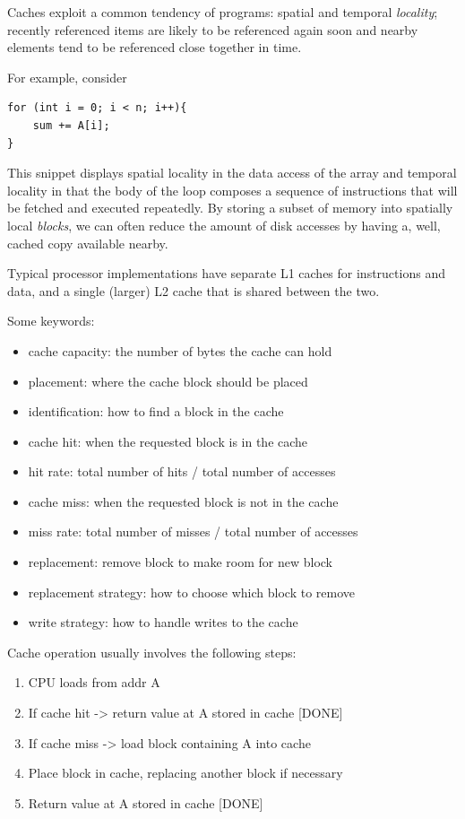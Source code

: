 \documentclass[../notes.tex]{subfiles}
\begin{document}
Caches exploit a common tendency of programs: spatial and temporal \textit{locality}; recently referenced items are likely to be referenced again soon and nearby elements tend to be referenced close together in time.

For example, consider


\begin{listing}[H]
\begin{verbatim}
for (int i = 0; i < n; i++){
	sum += A[i];
}
\end{verbatim}
\end{listing}

This snippet displays spatial locality in the data access of the array and temporal locality in that the body of the loop composes a sequence of instructions that will be fetched and executed repeatedly.
By storing a subset of memory into spatially local \textit{blocks}, we can often reduce the amount of disk accesses by having a, well, cached copy available nearby.


Typical processor implementations have separate L1 caches for instructions and data, and a single (larger) L2 cache that is shared between the two.

Some keywords:


\begin{itemize}
	\item cache capacity: the number of bytes the cache can hold
	\item placement: where the cache block should be placed
	\item identification: how to find a block in the cache
	\item cache hit: when the requested block is in the cache
	\item hit rate: total number of hits / total number of accesses
	\item cache miss: when the requested block is not in the cache
	\item miss rate: total number of misses / total number of accesses
	\item replacement: remove block to make room for new block
	\item replacement strategy: how to choose which block to remove
	\item write strategy: how to handle writes to the cache
\end{itemize}


Cache operation usually involves the following steps:

\begin{enumerate}
	\item CPU loads from addr A
	\item If cache hit -> return value at A stored in cache [DONE]
	\item If cache miss -> load block containing A into cache
	\item Place block in cache, replacing another block if necessary
	\item Return value at A stored in cache [DONE]
\end{enumerate}
\end{document}
